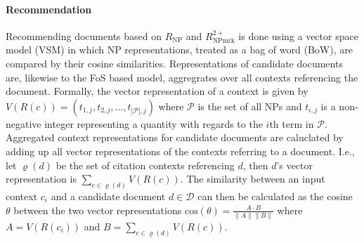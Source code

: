 \paragraph{Recommendation} Recommending documents based on ${R_{\text{NP}}}$ and ${R_{\text{NPmrk}}^{2+}}$ is done using a vector space model (VSM) in which NP representations, treated as a bag of word (BoW), are compared by their cosine similarities. Representations of candidate documents are, likewise to the FoS based model, aggregrates over all contexts referencing the document. Formally, the vector representation of a context is given by $V(R(c)) = (t_{1,j}, t_{2,j}, ..., t_{|\mathcal{P}|,j})$ where $\mathcal{P}$ is the set of all NPs %
and $t_{i,j}$ is a non-negative integer representing a quantity with regards to the $i$th term in $\mathcal{P}$. Aggregated context representations for candidate documents are caluclated by adding up all vector representations of the contexts referring to a document. I.e., let $\varrho(d)$ be the set of citation contexts referencing $d$, then $d$'s vector representation is $\sum\limits_{c \in \varrho(d)} V(R(c))$. The similarity between an input context $c_i$ and a candidate document $d\in \mathcal{D}$ can then be calculated as the cosine $\theta$ between the two vector representations ${\mathrm{cos}(\theta)=\frac{A\cdot B}{\|A\| \|B\|}}$ where  $A=V(R(c_i))$ and $B=\sum\limits_{c \in \varrho(d)} V(R(c))$.

